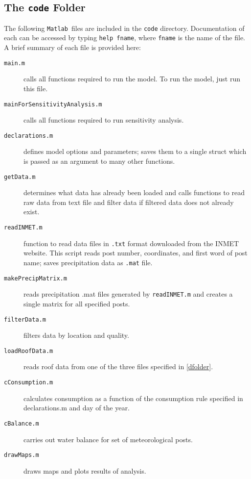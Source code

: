 \documentclass[11pt]{article} %
\newcommand{\fn}[1]{\texttt{#1}} %
\newcommand{\code}[1]{\texttt{#1}} %
\newcommand{\mtlb}{\texttt{Matlab\ }}
\begin{document}
\subsection{The \fn{code} Folder}
The following \mtlb files are included in the \fn{code} directory. Documentation of each can be accessed by typing \code{help fname}, where \code{fname} is the name of the file. A brief summary of each file is provided here:
\begin{description}
\item[\fn{main.m}] calls all functions required to run the model. To run the model, just run this file.
\item[\fn{mainForSensitivityAnalysis.m}] calls all functions required to run sensitivity analysis.
\item[\fn{declarations.m}] defines model options and parameters; saves them to a single struct which is passed as an argument to many other functions.
\item[\fn{getData.m}] determines what data has already been loaded and calls functions to read raw data from text file and filter data if filtered data does not already exist.
\item[\fn{readINMET.m}] function to read data files in \fn{.txt} format downloaded from the \ac{INMET} website. This script reads post number, coordinates, and first word of post name; saves precipitation data as \fn{.mat} file.
\item[\fn{makePrecipMatrix.m}] reads precipitation .mat files generated by \fn{readINMET.m} and creates a single matrix for all specified posts.
\item[\fn{filterData.m}] filters data by location and quality.
\item[\fn{loadRoofData.m}] reads roof data from one of the three files specified in \cref{dfolder}.
\item[\fn{cConsumption.m}] calculates consumption as a function of the consumption rule specified in declarations.m and day of the year.
\item[\fn{cBalance.m}] carries out water balance for set of meteorological posts.
\item[\fn{drawMaps.m}] draws maps and plots results of analysis.
\end{description}
\end{document}
